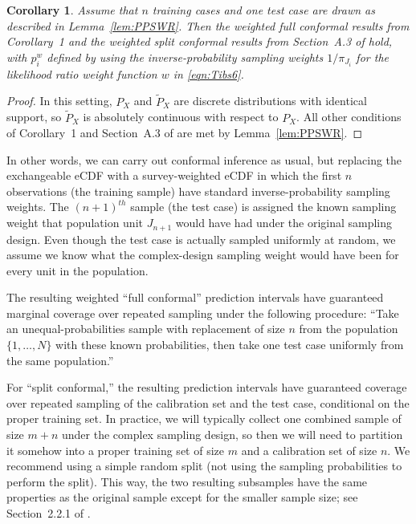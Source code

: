 \documentclass[10.5pt, letterpaper]{article}
\numberwithin{table}{section}
\numberwithin{figure}{section}
\numberwithin{equation}{section}
\newtheorem{corollary}{Corollary}
\begin{document}
\setcounter{corollary}{1}
\begin{corollary}
Assume that $n$ training cases and one test case are drawn as described in Lemma~\ref{lem:PPSWR}. Then the weighted full conformal results from Corollary~1 and the weighted split conformal results from Section~A.3 of \cite{tibshirani2019conformal} hold, with $p_i^w$ defined by using the inverse-probability sampling weights $1/\pi_{J_i}$ for the likelihood ratio weight function $w$ in \eqref{eqn:Tibs6}.
\end{corollary}
\begin{proof}
In this setting, ${P}_X$ and $\tilde{P}_X$ are discrete distributions with identical support, so $\tilde{P}_X$ is absolutely continuous with respect to ${P}_X$. All other conditions of Corollary~1 and Section~A.3 of \cite{tibshirani2019conformal} are met by Lemma~\ref{lem:PPSWR}.
\end{proof}

In other words, we can carry out conformal inference as usual, but replacing the exchangeable eCDF with a survey-weighted eCDF in which the first $n$ observations (the training sample) have standard inverse-probability sampling weights. The $(n+1)^{th}$ sample (the test case) is assigned the known sampling weight that population unit $J_{n+1}$ would have had under the original sampling design. Even though the test case is actually sampled uniformly at random, we assume we know what the complex-design sampling weight would have been for every unit in the population.

The resulting weighted ``full conformal'' prediction intervals have guaranteed marginal coverage over repeated sampling under the following procedure:
``Take an unequal-probabilities sample with replacement of size $n$ from the population $\{1,\ldots,N\}$ with these known probabilities, then take one test case uniformly from the same population.''

For ``split conformal,'' the resulting prediction intervals have guaranteed coverage over repeated sampling of the calibration set and the test case, conditional on the proper training set. In practice, we will typically collect one combined sample of size $m+n$ under the complex sampling design, so then we will need to partition it somehow into a proper training set of size $m$ and a calibration set of size $n$. We recommend using a simple random split (not using the sampling probabilities to perform the split). This way, the two resulting subsamples have the same properties as the original sample except for the smaller sample size; see Section~2.2.1 of \cite{wieczorek2022kfold}.
\end{document}
